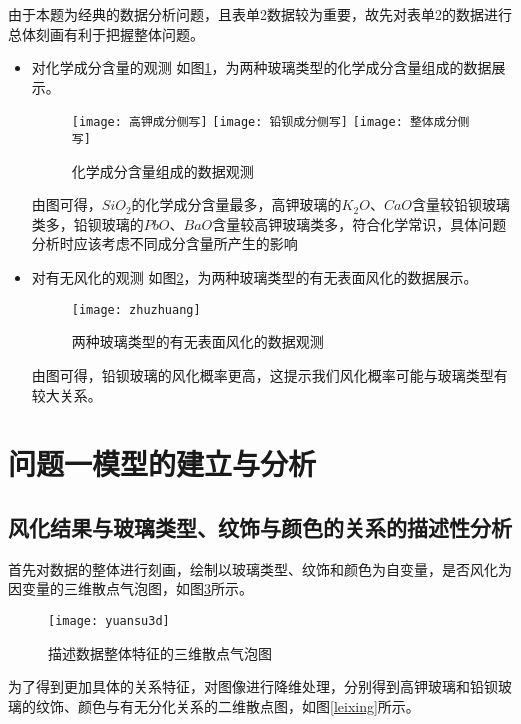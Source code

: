 \documentclass[withoutpreface,bwprint]{cumcmthesis} %
\begin{document}
由于本题为经典的数据分析问题，且表单2数据较为重要，故先对表单2的数据进行总体刻画有利于把握整体问题。

\begin{itemize}
	\item 对化学成分含量的观测 如图\ref{cexie}，为两种玻璃类型的化学成分含量组成的数据展示。
	
	\begin{figure}[!h]
		\centering
		\texttt{[image: 高钾成分侧写]}
		\texttt{[image: 铅钡成分侧写]}
		\texttt{[image: 整体成分侧写]}
		\caption{化学成分含量组成的数据观测}
		\label{cexie}
	\end{figure}


	由图可得，$SiO_{2}$的化学成分含量最多，高钾玻璃的$K_{2}O$、$CaO$含量较铅钡玻璃类多，铅钡玻璃的$PbO$、$BaO$含量较高钾玻璃类多，符合化学常识，具体问题分析时应该考虑不同成分含量所产生的影响
	
	
	\item 对有无风化的观测 如图\ref{zhuzhuang}，为两种玻璃类型的有无表面风化的数据展示。
	
	\begin{figure}[!h]
		\centering
		\texttt{[image: zhuzhuang]}
		\caption{两种玻璃类型的有无表面风化的数据观测}
		\label{zhuzhuang}
	\end{figure}
	
	由图可得，铅钡玻璃的风化概率更高，这提示我们风化概率可能与玻璃类型有较大关系。
	
	
\end{itemize}


\section{问题一模型的建立与分析}
\subsection{风化结果与玻璃类型、纹饰与颜色的关系的描述性分析}
首先对数据的整体进行刻画，绘制以玻璃类型、纹饰和颜色为自变量，是否风化为因变量的三维散点气泡图，如图\ref{yuansu3d}所示。

\begin{figure}[!h]
	\centering
	\texttt{[image: yuansu3d]}
	\caption{描述数据整体特征的三维散点气泡图}
	\label{yuansu3d}
\end{figure}


为了得到更加具体的关系特征，对图像进行降维处理，分别得到高钾玻璃和铅钡玻璃的纹饰、颜色与有无分化关系的二维散点图，如图\ref{leixing}所示。
\end{document}
